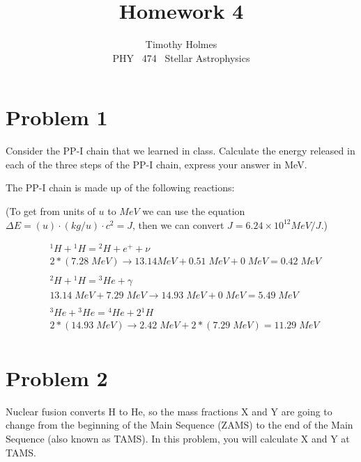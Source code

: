 \documentclass[11pt]{article}
\newcommand{\HWnum}{4}
\newcommand{\CourseNum}{474}           %
\newcommand{\Subject}{PHY}
\begin{document}

\title{Homework {\HWnum}}
\author{Timothy Holmes \\ \Subject ~ \CourseNum ~ Stellar Astrophysics}

\maketitle

\section*{Problem 1}
Consider the PP-I chain that we learned in class. Calculate the energy released in each of the three steps of the PP-I chain, express your answer in MeV.

The PP-I chain is made up of the following reactions:

(To get from units of $u$ to $MeV$ we can use the equation $\Delta E = (u) \cdot (kg/u) \cdot c^{2} = J$, then we can convert $J = 6.24 \times 10^{12} MeV/J$.) 

\begin{align*}
&{}^{1}H + {}^{1}H = {}^{2}H + e^{+} + \nu \\
&2 * (7.28 \; MeV) \rightarrow 13.14 MeV + 0.51 \; MeV + 0 \; MeV = 0.42 \; MeV\\ \\
&{}^{2}H + {}^{1}H = {}^{3}He + \gamma \\
&13.14 \; MeV + 7.29 \; MeV \rightarrow 14.93 \; MeV + 0 \; MeV = 5.49 \; MeV\\ \\
&{}^{3}He + {}^{3}He = {}^{4}He + 2{}^{1}H  \\
&2 * (14.93 \; MeV)\rightarrow 2.42 \; MeV + 2 * (7.29 \; MeV) = 11.29 \; MeV\\
\end{align*}



\clearpage

\section*{Problem 2}

Nuclear fusion converts H to He, so the mass fractions X and Y are going to change from the beginning of the Main Sequence (ZAMS) to the end of the Main Sequence (also known as TAMS). In this problem, you will calculate X and Y at TAMS.
\end{document}
